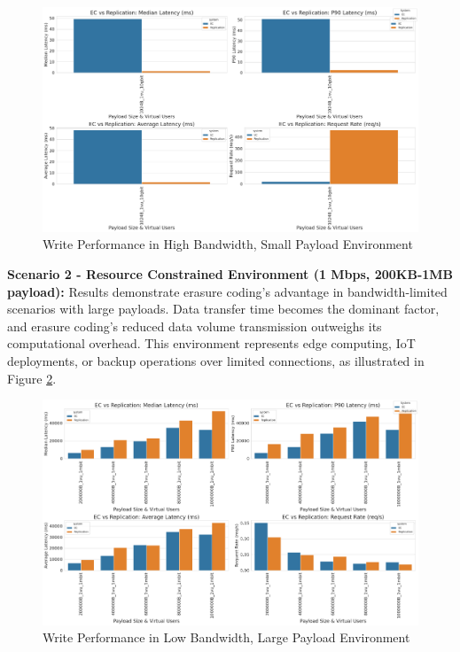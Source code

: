 \begin{figure}[ht]
\centering
\includegraphics[width=\columnwidth]{resources/chapter-4/write_smload_fastnet.png}
\caption{Write Performance in High Bandwidth, Small Payload Environment}
\label{fig:write-smload-fastnet}
\end{figure}

\textbf{Scenario 2 - Resource Constrained Environment (1 Mbps, 200KB-1MB payload):} Results demonstrate erasure coding's advantage in bandwidth-limited scenarios with large payloads. Data transfer time becomes the dominant factor, and erasure coding's reduced data volume transmission outweighs its computational overhead. This environment represents edge computing, IoT deployments, or backup operations over limited connections, as illustrated in Figure \ref{fig:write-bigload-slownet}.

\begin{figure}[ht]
\centering
\includegraphics[width=\columnwidth]{resources/chapter-4/write_bigload_slownet.png}
\caption{Write Performance in Low Bandwidth, Large Payload Environment}
\label{fig:write-bigload-slownet}
\end{figure}

